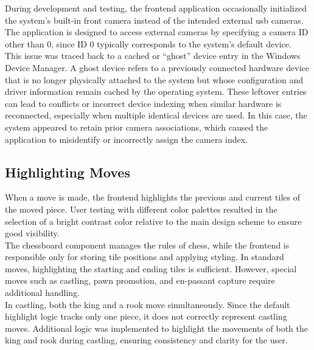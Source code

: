 During development and testing, the frontend application occasionally initialized the system’s built-in front camera instead of the intended external \gls{usb} cameras. The application is designed to access external cameras by specifying a camera ID other than 0, since ID 0 typically corresponds to the system’s default device. \\

This issue was traced back to a cached or “ghost” device entry in the Windows Device Manager. A ghost device refers to a previously connected hardware device that is no longer physically attached to the system but whose configuration and driver information remain cached by the operating system. These leftover entries can lead to conflicts or incorrect device indexing when similar hardware is reconnected, especially when multiple identical devices are used. In this case, the system appeared to retain prior camera associations, which caused the application to misidentify or incorrectly assign the camera index. \\

\subsection{Highlighting Moves}
When a move is made, the frontend highlights the previous and current tiles of the moved piece. User testing with different color palettes resulted in the selection of a bright contrast color relative to the main design scheme to ensure good visibility. \\

The chessboard component manages the rules of chess, while the frontend is responsible only for storing tile positions and applying styling. In standard moves, highlighting the starting and ending tiles is sufficient. However, special moves such as \gls{castling}, pawn \gls{promotion}, and \gls{en-passant} capture require additional handling. \\

In \gls{castling}, both the king and a rook move simultaneously. Since the default highlight logic tracks only one piece, it does not correctly represent \gls{castling} moves. Additional logic was implemented to highlight the movements of both the king and rook during \gls{castling}, ensuring consistency and clarity for the user.





